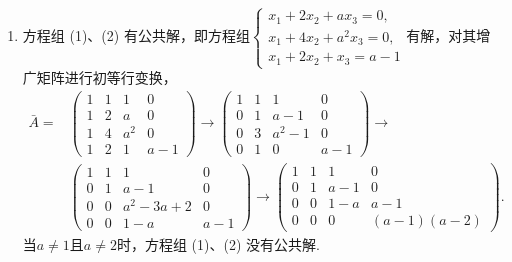 \begin{enumerate}
    \item 方程组 (1)、(2) 有公共解，即方程组$\begin{cases}
                  x_1+2x_2+ax_3=0,   \\
                  x_1+4x_2+a^2x_3=0, \\
                  x_1+2x_2+x_3=a-1
              \end{cases}$有解，对其增广矩阵进行初等行变换，
          \begin{align*}
              \bar{A}= & \begin{pmatrix}
                             1 & 1 & 1   & 0   \\
                             1 & 2 & a   & 0   \\
                             1 & 4 & a^2 & 0   \\
                             1 & 2 & 1   & a-1
                         \end{pmatrix}\rightarrow
              \begin{pmatrix}
                  1 & 1 & 1     & 0   \\
                  0 & 1 & a-1   & 0   \\
                  0 & 3 & a^2-1 & 0   \\
                  0 & 1 & 0     & a-1
              \end{pmatrix}\rightarrow               \\
                       & \begin{pmatrix}
                             1 & 1 & 1        & 0   \\
                             0 & 1 & a-1      & 0   \\
                             0 & 0 & a^2-3a+2 & 0   \\
                             0 & 0 & 1-a      & a-1
                         \end{pmatrix}\rightarrow
              \begin{pmatrix}
                  1 & 1 & 1   & 0          \\
                  0 & 1 & a-1 & 0          \\
                  0 & 0 & 1-a & a-1        \\
                  0 & 0 & 0   & (a-1)(a-2)
              \end{pmatrix}.
          \end{align*}
          当$a\neq 1$且$a\neq 2$时，方程组 (1)、(2) 没有公共解.


\end{enumerate}
